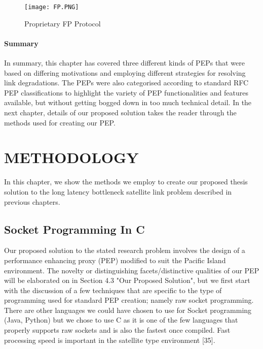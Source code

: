\documentclass{uathesis}
\begin{document}
\begin{figure}[ht!]
    \centering
    \texttt{[image: FP.PNG]}
    \caption{Proprietary FP Protocol}
    \label{fig:FP}
\end{figure}

\subsubsection*{Summary}
In summary, this chapter has covered three different kinds of PEPs that were based on differing motivations and employing different strategies for resolving link degradations. The PEPs were also categorised according to standard RFC PEP classifications to highlight the variety of PEP functionalities and features available, but without getting bogged down in too much technical detail.  In the next chapter, details of our proposed solution takes the reader through the methods used for creating our PEP.






\chapter{METHODOLOGY}

In this chapter, we show the methods we employ to create our proposed thesis solution to the long latency bottleneck satellite link problem described in previous chapters. 

\section{Socket Programming In C}
Our proposed solution to the stated research problem involves the design of a performance enhancing proxy (PEP) modified to suit the Pacific Island environment. The novelty or distinguishing facets/distinctive qualities of our PEP will be elaborated on in Section 4.3 "Our Proposed Solution", but we first start with the discussion of a few techniques that are specific to the type of programming used for standard PEP creation; namely raw socket programming. There are other languages we could have chosen to use for Socket programming (Java, Python) but we chose to use C as it is one of the few languages that properly supports raw sockets and is also the fastest once compiled. Fast processing speed is important in the satellite type environment [35].\\
\end{document}
